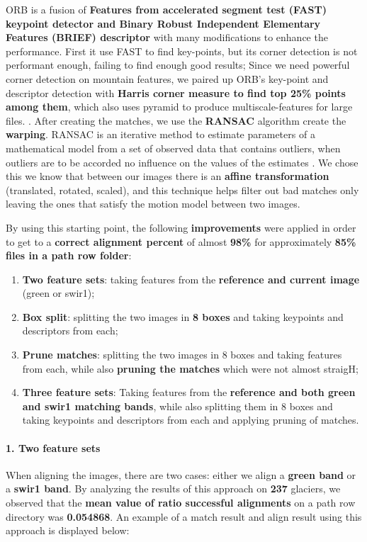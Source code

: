 \documentclass[12pt, a4paper]{report}
\begin{document}
	ORB is a fusion of \textbf{Features from accelerated segment test (FAST) keypoint detector  \cite{fast_1} and Binary Robust Independent Elementary Features (BRIEF) descriptor}  \cite{brief_1} with many modifications to enhance the performance. First it use FAST to find key-points, but its corner detection is not performant enough, failing to find enough good results; Since we need powerful corner detection on mountain features, we paired up ORB's key-point and descriptor detection with \textbf{Harris corner measure \cite{harris_1} to find top 25\% points among them}, which also uses pyramid to produce multiscale-features for large files. \cite{orb_1}. 
	\vskip 0.2cm
	After creating the matches, we use the \textbf{RANSAC} algorithm create the \textbf{warping}. RANSAC is an iterative method to estimate parameters of a mathematical model from a set of observed data that contains outliers, when outliers are to be accorded no influence on the values of the estimates \cite{ransac_2}. We chose this we know that between our images there is an \textbf{affine transformation} (translated, rotated, scaled), and this technique helps filter out bad matches only leaving the ones that satisfy the motion model between two images. 
	
	By using this starting point, the following \textbf{improvements} were applied in order to get to a \textbf{correct alignment percent} of almost \textbf{98\%} for approximately \textbf{85\% files in a path row folder}:
	\begin{enumerate}
		\item \textbf{Two feature sets}: taking features from the \textbf{reference and current image} (green or swir1);
		\item \textbf{Box split}: splitting the two images in \textbf{8 boxes} and taking keypoints and descriptors from each;
		\item \textbf{Prune matches}: splitting the two images in 8 boxes and taking features from each, while also \textbf{pruning the matches} which were not almost straigH;
		\item \textbf{Three feature sets}: Taking features from the \textbf{reference and both green and swir1 matching bands}, while also splitting them in 8 boxes and taking keypoints and descriptors from each and applying pruning of matches.
	\end{enumerate}
	
	\paragraph{1. Two feature sets} When aligning the images, there are two cases: either we align a \textbf{green band} or a \textbf{swir1 band}. By analyzing the results of this approach on \textbf{237} glaciers, we observed that the \textbf{mean value of ratio successful alignments} on a path row directory was \textbf{0.054868}. An example of a match result and align result using this approach is displayed below:
	
\end{document}
